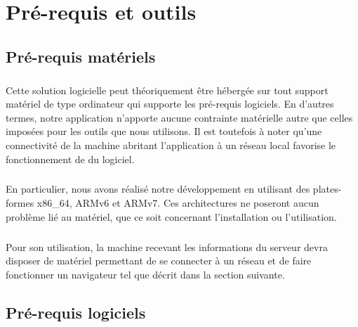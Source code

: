 \chapter{Pré-requis et outils}

\section{Pré-requis matériels}
    \paragraph{}
        Cette solution logicielle peut théoriquement être hébergée sur tout
        support matériel de type ordinateur qui supporte les pré-requis
        logiciels.
        En d'autres termes, notre application n'apporte aucune contrainte
        matérielle autre que celles imposées pour les outils que nous
        utilisons.
        Il est toutefois à noter qu'une connectivité de la machine abritant
        l'application à un réseau local favorise le fonctionnement de du logiciel.
    \paragraph{}
        En particulier, nous avons réalisé notre développement en utilisant des plates-formes x86\_64, ARMv6 et ARMv7. Ces architectures ne poseront aucun problème lié au matériel, que ce soit concernant l'installation ou l'utilisation.

    \paragraph{}
        Pour son utilisation, la machine recevant les informations du serveur
        devra disposer de matériel permettant de se connecter à un réseau et
        de faire fonctionner un navigateur tel que décrit dans la section
        suivante.

\section{Pré-requis logiciels}
